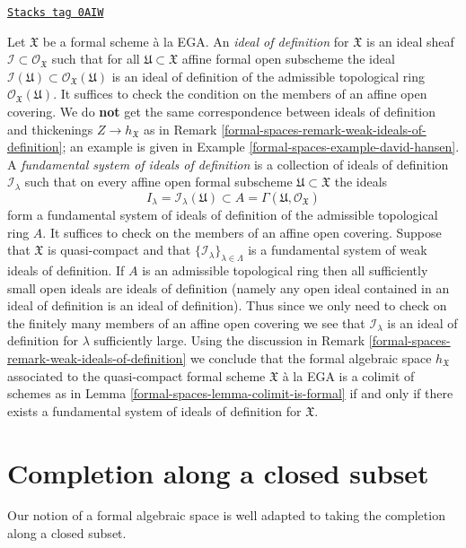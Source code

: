 \begin{remark}

\label{formal-spaces-remark-ideals-of-definition}
\href{https://stacks.math.columbia.edu/tag/0AIW}{\texttt{Stacks tag 0AIW}}

Let $\mathfrak X$ be a formal scheme \`a la EGA.
An {\it ideal of definition} for $\mathfrak X$ is an ideal sheaf
$\mathcal{I} \subset \mathcal{O}_\mathfrak X$ such that
for all $\mathfrak U \subset \mathfrak X$ affine formal open subscheme
the ideal
$\mathcal{I}(\mathfrak U) \subset \mathcal{O}_\mathfrak X(\mathfrak U)$
is an ideal of definition of the admissible topological ring
$\mathcal{O}_\mathfrak X(\mathfrak U)$.
It suffices to check the condition on the members of an affine open covering.
We do {\bf not} get the same correspondence between ideals of definition
and thickenings $Z \to h_\mathfrak X$ as in
Remark \ref{formal-spaces-remark-weak-ideals-of-definition}; an example
is given in Example \ref{formal-spaces-example-david-hansen}.
A {\it fundamental system of ideals of definition}
is a collection of ideals of definition
$\mathcal{I}_\lambda$ such that on every affine open
formal subscheme $\mathfrak U \subset \mathfrak X$ the
ideals
$$
I_\lambda = \mathcal{I}_\lambda(\mathfrak U) \subset
A = \Gamma(\mathfrak U, \mathcal{O}_\mathfrak X)
$$
form a fundamental system of ideals of definition of the
admissible topological ring $A$. It suffices to check
on the members of an affine open covering. Suppose that $\mathfrak X$
is quasi-compact and that $\{\mathcal{I}_\lambda\}_{\lambda \in \Lambda}$
is a fundamental system of weak ideals of definition.
If $A$ is an admissible topological ring then all
sufficiently small open ideals are ideals of definition
(namely any open ideal contained in an ideal of definition
is an ideal of definition). Thus since we only need to check
on the finitely many members of an affine open covering
we see that $\mathcal{I}_\lambda$ is an ideal of definition
for $\lambda$ sufficiently large. Using the discussion in
Remark \ref{formal-spaces-remark-weak-ideals-of-definition} we conclude that
the formal algebraic space $h_\mathfrak X$ associated to
the quasi-compact formal scheme $\mathfrak X$ \`a la EGA
is a colimit of schemes as in Lemma \ref{formal-spaces-lemma-colimit-is-formal}
if and only if there exists a fundamental system of ideals of definition
for $\mathfrak X$.
\end{remark}

\section{Completion along a closed subset}
\label{formal-spaces-section-completion}
Our notion of a formal algebraic space is well adapted to taking the
completion along a closed subset.

